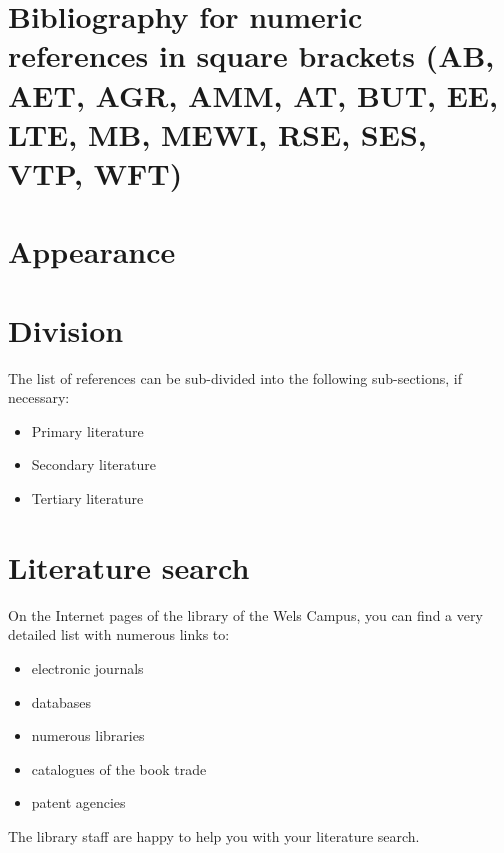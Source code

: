 \section{Bibliography for numeric references in square brackets (AB, AET, AGR, AMM, AT, BUT, EE, LTE, MB, MEWI, RSE, SES, VTP, WFT)}
\printbibliography[heading=none]

\vspace{1mm}

\newpage
\section*{Appearance}

\section*{Division}
The list of references can be sub-divided into the following sub-sections, if necessary:
\begin{itemize}
	\item	Primary literature 
	\item	Secondary literature
	\item	Tertiary literature
\end{itemize}

\section*{Literature search}
On the Internet pages of the library of the Wels Campus, you can find a very detailed list with numerous links to:
\begin{itemize}
	\item	electronic journals
	\item	databases
	\item	numerous libraries
	\item	catalogues of the book trade
	\item	patent agencies

\end{itemize}
The library staff are happy to help you with your literature search.

